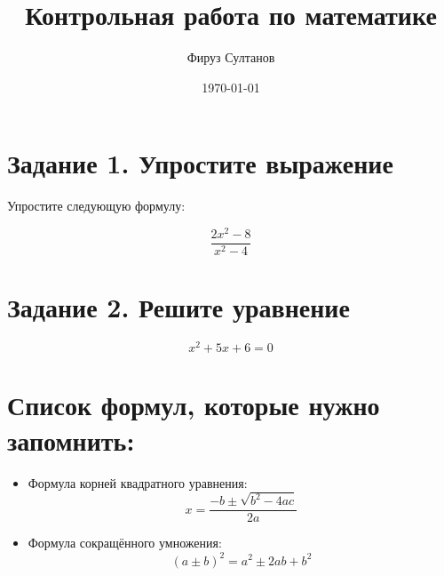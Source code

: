 \documentclass[12pt]{article}
\title{Контрольная работа по математике}
\author{Фируз Султанов}
\date{\today}
\begin{document}
\maketitle

\section*{Задание 1. Упростите выражение}

Упростите следующую формулу:

\[
\frac{2x^2 - 8}{x^2 - 4}
\]

\section*{Задание 2. Решите уравнение}

\[
x^2 + 5x + 6 = 0
\]

\section*{Список формул, которые нужно запомнить:}

\begin{itemize}
  \item Формула корней квадратного уравнения:
  \[
  x = \frac{-b \pm \sqrt{b^2 - 4ac}}{2a}
  \]
  \item Формула сокращённого умножения:
  \[
  (a \pm b)^2 = a^2 \pm 2ab + b^2
  \]
\end{itemize}
\end{document}
